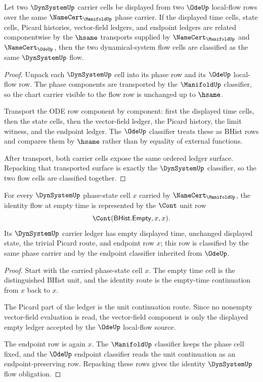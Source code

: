 \begin{theorem}
\label{thm:dynsystem-classifier-flow-transport}
Let two $\DynSystemUp$ carrier cells be displayed from two $\OdeUp$
local-flow rows over the same $\NameCert_{\ManifoldUp}$ phase carrier. If the
displayed time cells, state cells, Picard histories, vector-field ledgers, and
endpoint ledgers are related componentwise by the $\hsame$ transports supplied
by $\NameCert_{\ManifoldUp}$ and $\NameCert_{\OdeUp}$, then the two
dynamical-system flow cells are classified as the same $\DynSystemUp$ flow.
\end{theorem}
\begin{proof}
Unpack each $\DynSystemUp$ cell into its phase row and its $\OdeUp$ local-flow
row. The phase components are transported by the $\ManifoldUp$ classifier, so
the chart carrier visible to the flow row is unchanged up to $\hsame$.

Transport the ODE row component by component: first the displayed time cells,
then the state cells, then the vector-field ledger, the Picard history, the
limit witness, and the endpoint ledger. The $\OdeUp$ classifier treats these
as BHist rows and compares them by $\hsame$ rather than by equality of
external functions.

After transport, both carrier cells expose the same ordered ledger surface.
Repacking that transported surface is exactly the $\DynSystemUp$ classifier,
so the two flow cells are classified together.
\end{proof}

\begin{theorem}
\label{thm:dynsystem-identity-flow-obligation}
For every $\DynSystemUp$ phase-state cell $x$ carried by
$\NameCert_{\ManifoldUp}$, the identity flow at empty time is represented by
the $\Cont$ unit row
$$
\Cont(\mathsf{BHist.Empty},x,x).
$$
Its $\DynSystemUp$ carrier ledger has empty displayed time, unchanged
displayed state, the trivial Picard route, and endpoint row $x$; this row is
classified by the same phase carrier and by the endpoint classifier inherited
from $\OdeUp$.
\end{theorem}
\begin{proof}
Start with the carried phase-state cell $x$. The empty time cell is the
distinguished BHist unit, and the identity route is the empty-time
continuation from $x$ back to $x$.

The Picard part of the ledger is the unit continuation route. Since no
nonempty vector-field evaluation is read, the vector-field component is only
the displayed empty ledger accepted by the $\OdeUp$ local-flow source.

The endpoint row is again $x$. The $\ManifoldUp$ classifier keeps the phase
cell fixed, and the $\OdeUp$ endpoint classifier reads the unit continuation
as an endpoint-preserving row. Repacking these rows gives the identity
$\DynSystemUp$ flow obligation.
\end{proof}

